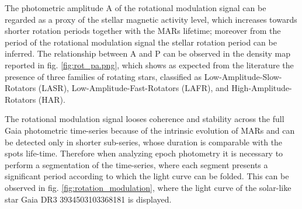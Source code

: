 The photometric amplitude A of the rotational modulation signal can be regarded as a proxy of the stellar magnetic activity level, which increases towards shorter rotation periods together with the MARs lifetime; moreover from the period of the rotational modulation signal the stellar rotation period can be inferred. 
The relationship between A and P can be observed in the density map reported in fig. \ref{fig:rot_pa.png}, which shows as expected from the literature the presence of three families of rotating stars, classified as Low-Amplitude-Slow-Rotators (LASR),  Low-Amplitude-Fast-Rotators (LAFR), and High-Amplitude-Rotators (HAR).\\
\begin{comment}
The data points could have been color-coded according to the Pearson Correlation Coefficient $r_0$(G, ($G_{BP}$ - $G_{RP}$)) measured in the whole time-series. From the plot it could have been inferred that HAR variables exhibit a strong positive correlation between magnitude and colour variations: as their brightness decreases their colour gets redder.
\end{comment}
The rotational modulation signal looses coherence and stability across the full Gaia photometric time-series because of the intrinsic evolution of MARs and can be detected only in shorter sub-series, whose duration is comparable with the spots life-time.
Therefore when analyzing epoch photometry it is necessary to perform a segmentation of the time-series, where each segment presents a significant period according to which the light curve can be folded.
This can be observed in fig. \ref{fig:rotation_modulation}, where the light curve of the solar-like star Gaia DR3 3934503103368181 is displayed.


\begin{comment}
The best estimate for the stellar rotation period (supplied as
best_rotation_period in the gdr3_rotmod catalog) is com-
puted by taking the mode of the significant periods distribution.
Each time-series segment, in which a significant period P
is detected, is folded according to P.

the Gaia scanning law favors the detection of stars with short rotation periods (P < 5 d).

# parameters 
-general colour–colour relation followed by most solar-like sources in the literature (with a model of G − G RP given G BP − G RP
-patterns of magnitude-colour variations for thousands of magnetically active stars
\end{comment}













